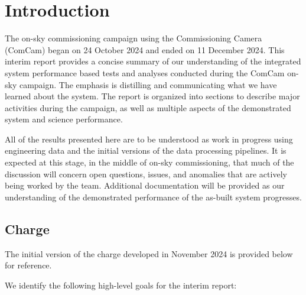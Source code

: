 \section{Introduction}
\label{sec:introduction}

The \VeraRubinObservatory on-sky commissioning campaign using the Commissioning Camera (ComCam) began on 24 October 2024 and ended on 11 December 2024.
This interim report provides a concise summary of our understanding of the integrated system performance based tests and analyses conducted during the ComCam on-sky campaign.
The emphasis is distilling and communicating what we have learned about the system.
The report is organized into sections to describe major activities during the campaign, as well as multiple aspects of the demonstrated system and science performance.

\begin{warning}
All of the results presented here are to be understood as work in progress using engineering data and the
initial versions of the data processing pipelines.
It is expected at this stage, in the middle of on-sky commissioning, that much of the discussion will concern open questions, issues, and anomalies that are actively being worked by the team.
Additional documentation will be provided as our understanding of the demonstrated performance of the as-built system progresses.
\end{warning}

\subsection{Charge}

\begin{note}
    The initial version of the charge developed in November 2024 is provided below for reference.
\end{note}

We identify the following high-level goals for the interim report:

